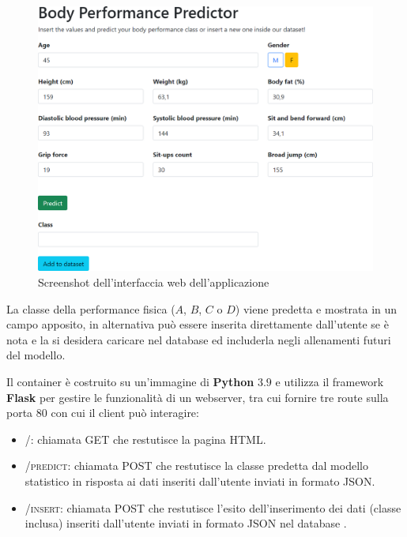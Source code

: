 \documentclass[12pt,a4paper]{report}
\begin{document}
\begin{figure}[H]
  \includegraphics[width=\textwidth]{interfaccia}
  \centering
  \caption{Screenshot dell'interfaccia web dell'applicazione}
\end{figure}

La classe della performance fisica ($A$, $B$, $C$ o $D$) viene predetta
e mostrata in un campo apposito, in alternativa può essere inserita
direttamente dall'utente se è nota e la si desidera caricare
nel database ed includerla negli allenamenti futuri del modello.

Il container è costruito su un'immagine di \textbf{Python} $3.9$
e utilizza il framework \textbf{Flask} per gestire le funzionalità
di un webserver, tra cui fornire tre route sulla porta $80$ con
cui il client può interagire:
\begin{itemize}
  \item \textsc{/}: chiamata GET che restutisce la pagina HTML.
  \item \textsc{/predict}: chiamata POST che restutisce la classe predetta dal modello statistico in risposta ai dati inseriti dall'utente inviati in formato JSON.
  \item \textsc{/insert}: chiamata POST che restutisce l'esito dell'inserimento dei dati (classe inclusa) inseriti dall'utente inviati in formato JSON nel database .
\end{itemize}
\end{document}
